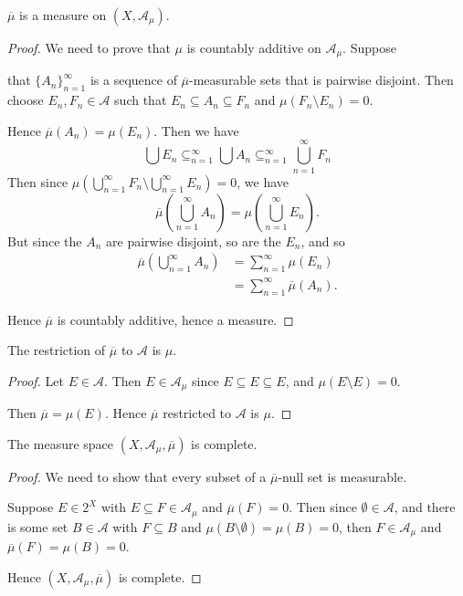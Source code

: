 \documentclass{unswmaths}
\begin{document}
\begin{lemma}
    $\overline{\mu}$ is a measure on $(X,\mathcal{A}_\mu)$.
\end{lemma}
\begin{proof}
    We need to prove that $\mu$ is countably additive on $\mathcal{A}_\mu$. Suppose
    
    that $\{A_n\}_{n=1}^\infty$ is a sequence of $\overline{\mu}$-measurable sets
    that is pairwise disjoint. Then choose $E_n,F_n \in \mathcal{A}$
    such that $E_n \subseteq A_n \subseteq F_n$ and $\mu(F_n\setminus E_n) = 0$. 
    
    Hence $\overline{\mu}(A_n) = \mu(E_n)$. 
    Then we have
    \begin{equation*}
        \bigcup E_n \subseteq_{n=1}^\infty \bigcup A_n \subseteq_{n=1}^\infty \bigcup_{n=1}^\infty F_n
    \end{equation*}
    Then since ${\mu}(\bigcup_{n=1}^\infty F_n\setminus \bigcup_{n=1}^\infty E_n) = 0$,
    we have
    \begin{equation*}
        \overline{\mu}(\bigcup_{n=1}^\infty A_n) = \mu(\bigcup_{n=1}^\infty E_n).
    \end{equation*} 
    But since the $A_n$ are pairwise disjoint, so are the $E_n$, and so
    \begin{align*}
        \overline{\mu}(\bigcup_{n=1}^\infty A_n) &= \sum_{n=1}^\infty \mu(E_n)\\ 
        &= \sum_{n=1}^\infty \overline{\mu}(A_n).
    \end{align*}
    
    Hence $\overline{\mu}$ is countably additive, hence a measure.
   
\end{proof} 

\begin{lemma}
    The restriction of $\overline{\mu}$ to $\mathcal{A}$
    is $\mu$.
\end{lemma}
\begin{proof}
    Let $E \in \mathcal{A}$. Then $E \in \mathcal{A}_\mu$
    since $E\subseteq E\subseteq E$, and $\mu (E\setminus E) = 0$.
    
    Then $\overline{\mu} = \mu(E)$. Hence $\overline{\mu}$
    restricted to $\mathcal{A}$ is $\mu$.
\end{proof}

\begin{lemma}
    The measure space $(X,\mathcal{A}_\mu,\overline{\mu})$
    is complete.
\end{lemma}
\begin{proof}
    We need to show that every subset of a $\overline{\mu}$-null
    set is measurable.
    
    Suppose $E \in 2^X$ with $E \subseteq F \in \mathcal{A}_\mu$
    and $\overline{\mu}(F) = 0$. Then since $\emptyset \in \mathcal{A}$,
    and there is some set $B \in \mathcal{A}$ with $F \subseteq B$
    and $\mu(B\setminus \emptyset) = \mu(B) = 0$,
    then $F \in \mathcal{A}_\mu$ and $\overline{\mu}(F) = \mu(B) = 0$.
    
    Hence $(X,\mathcal{A}_\mu, \overline{\mu})$ is complete.
\end{proof} 
\end{document}
